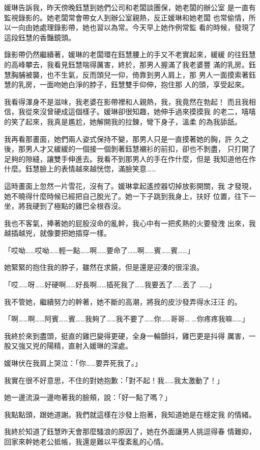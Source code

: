 媛琳告訴我，昨天傍晚鈺慧到她們公司和老闆談團保，她老闆的辦公室
是一直有監視錄影的。她老闆常會帶女人到辦公室親熱，反正媛琳和她老闆
也常偷情，所以一向由她處理錄影帶，她也習以為常。今天早上她作例常監
看的時候，發現了這段鈺慧的香豔鏡頭。

錄影帶仍然繼續著，媛琳的老闆環在鈺慧腰上的手又不老實起來，緩緩
的往鈺慧的高峰攀去，我看見鈺慧喘得厲害，終於，那男人握滿了我老婆豐
滿的乳房。鈺慧胸脯被襲，也不生氣，反而頭兒一仰，倚靠到男人肩上，那
男人一面摸索著鈺慧的乳房，一面吻她白淨的脖子，鈺慧雙手仰伸，抱住那
人的頭，享受起來。

我看得渾身不是滋味，我老婆在影帶裡和人親熱，我，我竟然在勃起！
而且我相信，我從來沒曾硬成這個樣子。媛琳卻很知趣，她伸手過來摸摸我
的老二，嘻嘻的笑了起來，我真是尷尬，她解開我的拉鍊，彎下身子，溫柔
的為我舔舐。

我再看那畫面，她們兩人姿式保持不變，那男人只是一直摸著她的胸，許
久之後，那男人才又緩緩的一個接一個剝著鈺慧襯衫的前扣，卻也不剝盡，
只打開了足夠的隙縫，讓雙手伸進去。我看不到那男人的手在作什麼，但是
我知道他在作什麼。鈺慧臉上的表情越來越恍惚，滿臉笑意……

這時畫面上忽然一片雪花，沒有了。媛琳拿起遙控器切掉放影開關，我
才發現，她不曉得什麼時候已經把自己脫光了。她一下子跳到我身上，扶好
位置，往下一坐，將我硬到了極點的雞巴全根吞沒。

我也不客氣，捧著她的屁股沒命的亂幹，我心中有一把炙熱的火要發洩
出來，我越插越兇，就像要把她插穿一樣。

「哎呦……哎呦……輕一點……啊……要命了……啊……賓……賓……」

她緊緊的抱住我的脖子，雖然在求饒，但是還是迎湊的很淫浪。

「哎……呀……好硬啊……好長啊……插死我了……我要丟了……丟了
……」

我不管她，繼續努力的幹著，她不斷的高潮，將我的皮沙發弄得水汪汪
的。

「啊……啊……阿賓……賓……我夠了……我不要了……你……哥哥…
…你疼疼我嘛……」

我終於來到盡頭，挺直的雞巴變得更硬，全身一輪顫抖，雞巴更是抖得
厲害，一股又強又兇的陽精，直射入媛琳的深處。

媛琳伏在我肩上哭泣：「你……要弄死我了。」

我實在很不好意思，不住的對她抱歉：「對不起！我……我太激動了！」

她一邊流淚一邊吻著我的臉頰，說：「好一點了嗎？」

我點點頭，跟她道謝。我們就這樣在沙發上抱著，我知道她是在穩定我
的情緒。

我終於知道了鈺慧昨天會那麼騷浪的原因了，她在外面讓男人挑逗得春
情難抑，回家來幹她老公抵帳，我還是難以平復紊亂的心情。

